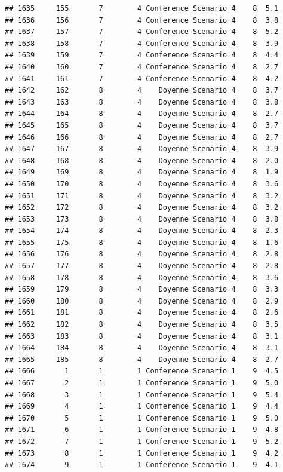 \documentclass[
]{article}
\begin{document}
\begin{verbatim}
## 1635     155       7        4 Conference Scenario 4    8  5.1
## 1636     156       7        4 Conference Scenario 4    8  3.8
## 1637     157       7        4 Conference Scenario 4    8  5.2
## 1638     158       7        4 Conference Scenario 4    8  3.9
## 1639     159       7        4 Conference Scenario 4    8  4.4
## 1640     160       7        4 Conference Scenario 4    8  2.7
## 1641     161       7        4 Conference Scenario 4    8  4.2
## 1642     162       8        4    Doyenne Scenario 4    8  3.7
## 1643     163       8        4    Doyenne Scenario 4    8  3.8
## 1644     164       8        4    Doyenne Scenario 4    8  2.7
## 1645     165       8        4    Doyenne Scenario 4    8  3.7
## 1646     166       8        4    Doyenne Scenario 4    8  2.7
## 1647     167       8        4    Doyenne Scenario 4    8  3.9
## 1648     168       8        4    Doyenne Scenario 4    8  2.0
## 1649     169       8        4    Doyenne Scenario 4    8  1.9
## 1650     170       8        4    Doyenne Scenario 4    8  3.6
## 1651     171       8        4    Doyenne Scenario 4    8  3.2
## 1652     172       8        4    Doyenne Scenario 4    8  3.2
## 1653     173       8        4    Doyenne Scenario 4    8  3.8
## 1654     174       8        4    Doyenne Scenario 4    8  2.3
## 1655     175       8        4    Doyenne Scenario 4    8  1.6
## 1656     176       8        4    Doyenne Scenario 4    8  2.8
## 1657     177       8        4    Doyenne Scenario 4    8  2.8
## 1658     178       8        4    Doyenne Scenario 4    8  3.6
## 1659     179       8        4    Doyenne Scenario 4    8  3.3
## 1660     180       8        4    Doyenne Scenario 4    8  2.9
## 1661     181       8        4    Doyenne Scenario 4    8  2.6
## 1662     182       8        4    Doyenne Scenario 4    8  3.5
## 1663     183       8        4    Doyenne Scenario 4    8  3.1
## 1664     184       8        4    Doyenne Scenario 4    8  3.1
## 1665     185       8        4    Doyenne Scenario 4    8  2.7
## 1666       1       1        1 Conference Scenario 1    9  4.5
## 1667       2       1        1 Conference Scenario 1    9  5.0
## 1668       3       1        1 Conference Scenario 1    9  5.4
## 1669       4       1        1 Conference Scenario 1    9  4.4
## 1670       5       1        1 Conference Scenario 1    9  5.0
## 1671       6       1        1 Conference Scenario 1    9  4.8
## 1672       7       1        1 Conference Scenario 1    9  5.2
## 1673       8       1        1 Conference Scenario 1    9  4.2
## 1674       9       1        1 Conference Scenario 1    9  4.1

\end{verbatim}
\end{document}
